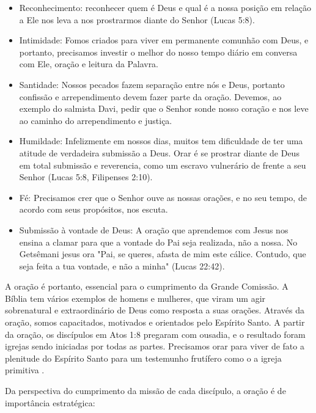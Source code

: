\documentclass[12pt]{abntex2}
\begin{document}
\begin{itemize}
	\item Reconhecimento: reconhecer quem é Deus e qual é a nossa posição em relação a Ele nos leva a nos prostrarmos diante do Senhor (Lucas 5:8).
	\item Intimidade: Fomos criados para viver em permanente comunhão com Deus, e portanto, precisamos investir o melhor do nosso tempo diário em conversa com Ele, oração e leitura da Palavra.
	\item Santidade: Nossos pecados fazem separação entre nós e Deus, portanto confissão e arrependimento devem fazer parte da oração. Devemos, ao exemplo do salmista Davi, pedir que o Senhor sonde nosso coração e nos leve ao caminho do arrependimento e justiça.
	\item Humildade: Infelizmente em nossos dias, muitos tem dificuldade de ter uma atitude de verdadeira submissão a Deus. Orar é se prostrar diante de Deus em total submissão e reverencia, como um escravo vulnerário de frente a seu Senhor (Lucas 5:8, Filipenses 2:10).
	\item Fé: Precisamos crer que o Senhor ouve as nossas orações, e no seu tempo, de acordo com seus propósitos, nos escuta.
	\item Submissão à vontade de Deus: A oração que aprendemos com Jesus nos ensina a clamar para que a vontade do Pai seja realizada, não a nossa. No Getsêmani jesus ora "Pai, se queres, afasta de mim este cálice. Contudo, que seja feita a tua vontade, e não a minha" (Lucas 22:42).

	\cite[p. 30,31]{brandao}  
\end{itemize}

  A oração é portanto, essencial para o cumprimento da Grande Comissão. A Bíblia tem vários exemplos de homens e mulheres, que viram um agir sobrenatural e extraordinário de Deus como resposta a suas orações. Através da oração, somos capacitados, motivados e orientados pelo Espírito Santo. A partir da oração, os discípulos em Atos 1:8 pregaram com ousadia, e o resultado foram igrejas sendo iniciadas por todas as partes. Precisamos orar para viver de fato a plenitude do Espírito Santo para um testemunho frutífero como o a igreja primitiva \cite[p. 32]{brandao}.

  Da perspectiva do cumprimento da missão de cada discípulo, a oração é de importância estratégica:
\end{document}
